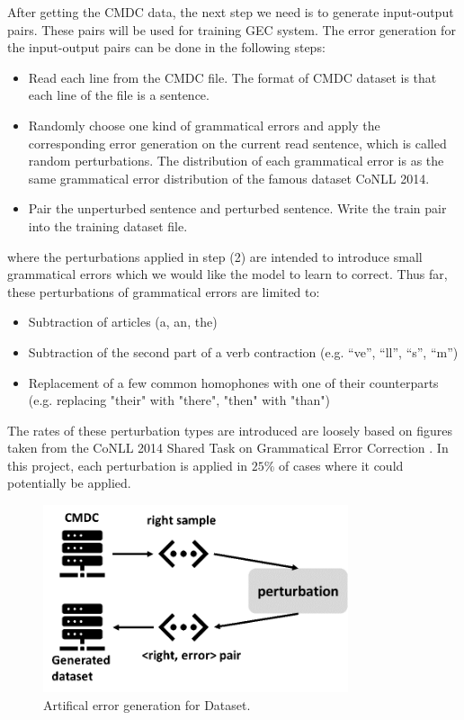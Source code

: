 After getting the CMDC data, the next step we need is to generate input-output pairs. These pairs will be used for training GEC system. The error generation for the input-output pairs can be done in the following steps:

\begin{itemize}
    \item Read each line from the CMDC file. The format of CMDC dataset is that each line of the file is a sentence.
    \item Randomly choose one kind of grammatical errors and apply the corresponding error generation on the current read sentence, which is called random perturbations. The distribution of each grammatical error is as the same grammatical error distribution of the famous dataset CoNLL 2014.
    \item Pair the unperturbed sentence and perturbed sentence. Write the train pair into the training dataset file.
\end{itemize}
where the perturbations applied in step (2) are intended to introduce small grammatical errors which we would like the model to learn to correct. Thus far, these perturbations of grammatical errors are limited to:
\begin{itemize}
    \item Subtraction of articles (a, an, the)
    \item Subtraction of the second part of a verb contraction (e.g. “ve”, “ll”, “s”, “m”)
    \item Replacement of a few common homophones with one of their counterparts (e.g. replacing "their" with "there", "then" with "than")
\end{itemize}
The rates of these perturbation types are introduced are loosely based on figures taken from the CoNLL 2014 Shared Task on Grammatical Error Correction \cite{ng2014conll}. In this project, each perturbation is applied in $25\%$ of cases where it could potentially be applied.
\begin{figure}[ht]
    \centering
    \includegraphics[width=0.8\textwidth]{AEGD.png}
    \caption{Artifical error generation for Dataset.}
    \label{fig:8}
\end{figure}

